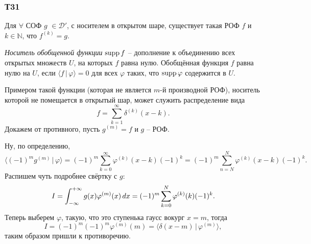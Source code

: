 \subsubsection*{Т31}
 
\begin{to_thr}[]
    Для $\forall$ СОФ $g$ $\in \mathcal D'$, с носителем в открытом шаре, существует такая РОФ $f$ и $k \in \mathbb{N}$, что $f^{(k)} = g$.
\end{to_thr}

\begin{to_def}
    \textit{Носитель обобщенной функции} $\mathop{\mathrm{supp}}\nolimits f$ -- дополнение к объединению всех открытых множеств $U$, на которых $f$ равна нулю.  Обобщённая функция $f$ равна нулю на $U$, если $\langle f \,|\, \varphi \rangle =0$ для всех $\varphi$ таких, что $\mathop{\mathrm{supp}}\nolimits \varphi$ содержится в $U$. 
\end{to_def}

Примером такой функции (которая не является $m$-й производной РОФ), носитель которой не помещается в открытый шар, может служить распределение вида
\begin{equation*}
    f = \sum_{k=1}^{\infty} \delta^{(k)} (x-k).
\end{equation*}
Докажем от противного, пусть $g^{(m)} = f$ и $g$ -- РОФ. 


Ну, по определению, 
\begin{equation*}
    \langle (-1)^m g^{(m)} \,|\, \varphi \rangle  = (-1)^m \sum_{k=0}^{\infty}  \varphi^{(k)} (x-k) (-1)^k = 
    (-1)^m \sum_{n=N}^{N} \varphi^{(k)} (x-k) (-1)^k.
\end{equation*}
Распишем чуть подробнее свёртку с $g$:
\begin{equation*}
    I = \int_{-\infty}^{+\infty} g(x) \varphi^{(m)} (x) \, d x = (-1)^m \sum_{k=0}^{N}  \varphi^{(k)} (k) (-1)^k.
\end{equation*}
Теперь выберем $\varphi$, такую, что это ступенька гаусс вокург $x = m$, тогда
\begin{equation*}
    I = (-1)^m (-1)^m \varphi^{(m)}(m) = \langle \delta(x-m) \,|\, \varphi^{(m)} \rangle ,
\end{equation*}
таким образом пришли к противоречию.


